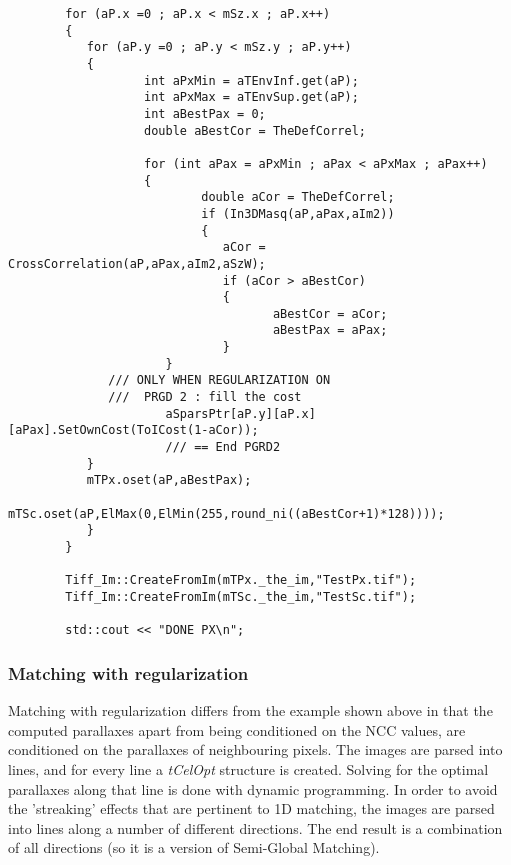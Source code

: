 \begin{lstlisting}
        for (aP.x =0 ; aP.x < mSz.x ; aP.x++)
        {
           for (aP.y =0 ; aP.y < mSz.y ; aP.y++)
           {
                   int aPxMin = aTEnvInf.get(aP);
                   int aPxMax = aTEnvSup.get(aP);
                   int aBestPax = 0;
                   double aBestCor = TheDefCorrel;

                   for (int aPax = aPxMin ; aPax < aPxMax ; aPax++)
                   {
                           double aCor = TheDefCorrel;
                           if (In3DMasq(aP,aPax,aIm2))
                           {
                              aCor = CrossCorrelation(aP,aPax,aIm2,aSzW);
                              if (aCor > aBestCor)
                              {
                                     aBestCor = aCor;
                                     aBestPax = aPax;
                              }
                      }
		      /// ONLY WHEN REGULARIZATION ON
		      ///  PRGD 2 : fill the cost
                      aSparsPtr[aP.y][aP.x][aPax].SetOwnCost(ToICost(1-aCor));
                      /// == End PGRD2
           }
           mTPx.oset(aP,aBestPax);
           mTSc.oset(aP,ElMax(0,ElMin(255,round_ni((aBestCor+1)*128))));
           }
        }

        Tiff_Im::CreateFromIm(mTPx._the_im,"TestPx.tif");
        Tiff_Im::CreateFromIm(mTSc._the_im,"TestSc.tif");

        std::cout << "DONE PX\n";

\end{lstlisting}



\subsubsection{Matching with regularization}
Matching with regularization differs from the example shown above in that the computed parallaxes apart from being conditioned on the NCC values, are conditioned on the parallaxes of neighbouring pixels. The images are parsed into lines, and for every line a \emph{tCelOpt }structure is created. Solving for the optimal parallaxes along that line is done with dynamic programming. In order to avoid the 'streaking' effects that are pertinent to 1D matching, the images are parsed into lines along a number of different directions. The end result is a combination of all directions (so it is a version of Semi-Global Matching).\newline

